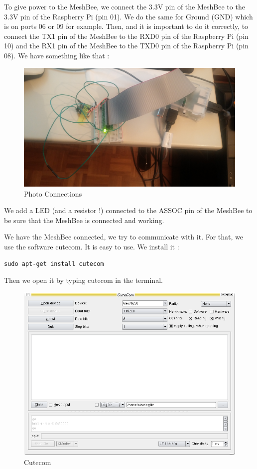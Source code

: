 To give power to the MeshBee, we connect the 3.3V pin of the MeshBee to the 3.3V pin of the Raspberry Pi (pin 01). We do the same for Ground (GND) which is on ports 06 or 09 for example. Then, and it is important to do it correctly, to connect the TX1 pin of the MeshBee to the RXD0 pin of the Raspberry Pi (pin 10) and the RX1 pin of the MeshBee to the TXD0 pin of the Raspberry Pi (pin 08). We have something like that :


\begin{figure}[ht]
\centering
\includegraphics[width=.6\linewidth]{connect_meshbee_rp}
\caption[Photo Connections]{\label{f:connect_meshbee_rp}Photo Connections}
\end{figure}

We add a LED (and a resistor !) connected to the ASSOC pin of the MeshBee to be sure that the MeshBee is connected and working.

We have the MeshBee connected, we try to communicate with it. For that, we use the software cutecom. It is easy to use. We install it :

\begin{lstlisting}[frame=single]
sudo apt-get install cutecom
\end{lstlisting}

Then we open it by typing cutecom in the terminal.

\begin{figure}[ht]
\centering
\includegraphics[width=.6\linewidth]{cutecom}
\caption[Cutecom]{\label{f:cutecom}Cutecom}
\end{figure}

